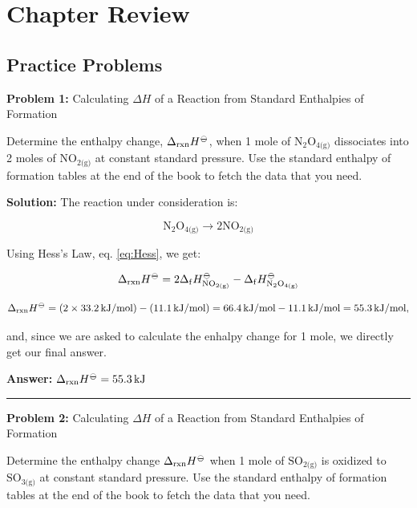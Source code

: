 \documentclass[
  9pt,
]{extbook}
\theoremstyle{definition}
\theoremstyle{definition}
\theoremstyle{definition}
\theoremstyle{remark}
\begin{document}
\hypertarget{rev4}{%
\section{Chapter Review}\label{rev4}}

\hypertarget{exer4}{%
\subsection{Practice Problems}\label{exer4}}

\textbf{Problem 1:} Calculating \(\Delta H\) of a Reaction from Standard Enthalpies of Formation

Determine the enthalpy change, \(\Delta_{\text{rxn}} H^{-\kern-6pt{\ominus}\kern-6pt-}\), when 1 mole of \(\text{N}_2 \text{O}_{4\text{(g)}}\) dissociates into 2 moles of \(\text{NO}_{2\text{(g)}}\) at constant standard pressure. Use the standard enthalpy of formation tables at the end of the book to fetch the data that you need.

\textbf{Solution:} The reaction under consideration is:

\[\text{N}_2 \text{O}_{4\text{(g)}} \rightarrow 2 \text{NO}_{2\text{(g)}}\]

Using Hess's Law, eq. \eqref{eq:Hess}, we get:

\[\Delta_{\text{rxn}} H^{-\kern-6pt{\ominus}\kern-6pt-}= 2 \Delta_{\mathrm{f}} H_{\text{NO}_{2\text{(g)}}}^{-\kern-6pt{\ominus}\kern-6pt-}-\Delta_{\mathrm{f}} H_{\text{N}_2 \text{O}_{4\text{(g)}}}^{-\kern-6pt{\ominus}\kern-6pt-}\]

\[\Delta_{\text{rxn}} H^{-\kern-6pt{\ominus}\kern-6pt-}= (2 \times 33.2 \, \text{kJ/mol}) - (11.1 \, \text{kJ/mol}) = 66.4 \, \text{kJ/mol} - 11.1 \, \text{kJ/mol} = 55.3 \, \text{kJ/mol},\]

and, since we are asked to calculate the enhalpy change for 1 mole, we directly get our final answer.

\textbf{Answer:} \(\Delta_{\text{rxn}} H^{-\kern-6pt{\ominus}\kern-6pt-}= 55.3 \, \text{kJ}\)

\begin{center}\rule{0.5\linewidth}{0.5pt}\end{center}

\textbf{Problem 2:} Calculating \(\Delta H\) of a Reaction from Standard Enthalpies of Formation

Determine the enthalpy change \(\Delta_{\text{rxn}} H^{-\kern-6pt{\ominus}\kern-6pt-}\) when 1 mole of \(\text{SO}_{2\text{(g)}}\) is oxidized to \(\text{SO}_{3\text{(g)}}\) at constant standard pressure. Use the standard enthalpy of formation tables at the end of the book to fetch the data that you need.
\end{document}
